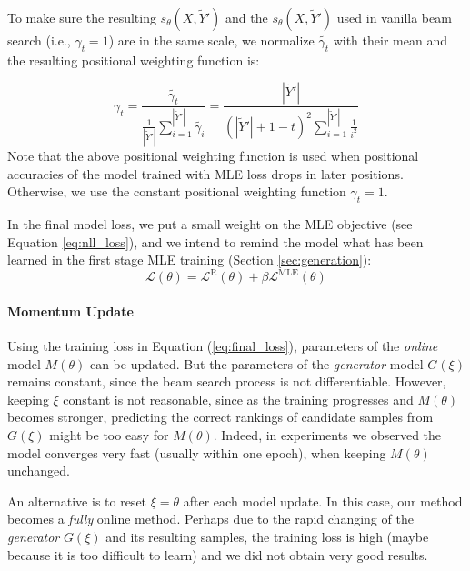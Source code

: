 \documentclass{article}
\begin{document}
To make sure the resulting $s_{\theta}(X, \tilde{Y}')$ and the $s_{\theta}(X, \tilde{Y}')$ used in vanilla beam search (i.e., $\gamma_t=1$)
are in the same scale, we normalize $\tilde{\gamma_t}$ with their mean and the resulting positional weighting function is:

\begin{equation}
    \label{eq:scoring2}
    \gamma_t = \frac{ \tilde{\gamma_t} }{\frac{1}{|\tilde{Y}'| } \sum_{i=1}^{|\tilde{Y}'|} \tilde{\gamma_i} } =  \frac{|\tilde{Y}'|}{(|\tilde{Y}'| + 1 - t)^2 \sum_{i=1}^{ |\tilde{Y}'| } \frac{1}{i^2} }
\end{equation}
Note that the above positional weighting function is used when positional accuracies of the model trained with MLE loss drops in later positions. Otherwise, we use the constant positional weighting function $\gamma_t = 1$.

In the final model loss, we put a small weight on the MLE objective (see Equation \ref{eq:nll_loss}), and we intend to remind the model what has been learned in the first stage MLE training (Section \ref{sec:generation}):
\begin{equation}
    \label{eq:final_loss}
    \mathcal{L}(\theta) = \mathcal{L}^{\text{R}}(\theta) + \beta  \mathcal{L}^{\text{MLE}}(\theta)
\end{equation}


\paragraph{Momentum Update} Using the training loss in Equation (\ref{eq:final_loss}), parameters of the \emph{online} model $M(\theta)$ can be updated. But the parameters of the \mbox{\emph{generator}} model $G(\xi)$ remains constant, since the beam search process is not differentiable. However, keeping $\xi$ constant is not reasonable, since as the training progresses and $M(\theta)$ becomes stronger, predicting the correct rankings of candidate samples from $G(\xi)$ might be too easy for $M(\theta)$. Indeed, in experiments we observed the model converges very fast (usually within one epoch), when keeping $M(\theta)$ unchanged. 

An alternative is to reset $\xi = \theta$ after each model update. In this case, our method becomes a \emph{fully} online method. Perhaps due to the rapid changing of the \emph{generator} $G(\xi)$ and its resulting  samples, the training loss is high (maybe because it is too difficult to learn) and we did not obtain very good results. 
\end{document}
